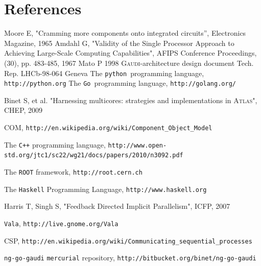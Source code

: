 \documentclass[a4paper]{jpconf}
\newcommand{\gaudi}{\textsc{Gaudi}}
\newcommand{\python}{\texttt{python}}
\newcommand{\cython}{\texttt{cython}}
\newcommand{\golang}{\texttt{Go}}
\begin{document}
\section*{References}
\begin{thebibliography}{9}
 Moore E, "Cramming more components onto integrated circuits'', Electronics Magazine, 1965
 Amdahl G, "Validity of the Single Processor Approach to Achieving Large-Scale Computing Capabilities", AFIPS Conference Proceedings, (30), pp. 483-485, 1967
 Mato P 1998 \gaudi-architecture design document Tech. Rep. LHCb-98-064 Geneva
 The \python\ programming language, \verb'http://python.org'
 The \golang\ programming language, \verb'http://golang.org/'

 Binet S, et al. "Harnessing multicores: strategies and
  implementations in \textsc{Atlas}", CHEP, 2009

 COM, \verb'http://en.wikipedia.org/wiki/Component_Object_Model'

 The \texttt{C++} programming language,
  \verb'http://www.open-std.org/jtc1/sc22/wg21/docs/papers/2010/n3092.pdf'

 The \texttt{ROOT} framework,
  \verb"http://root.cern.ch"

 The \texttt{Haskell} Programming Language,
  \verb'http://www.haskell.org'

 Harris T, Singh S, "Feedback
  Directed Implicit Parallelism", ICFP, 2007

 \texttt{Vala}, \verb'http://live.gnome.org/Vala'

 CSP,
  \verb'http://en.wikipedia.org/wiki/Communicating_sequential_processes'

 \texttt{ng-go-gaudi} \verb'mercurial' repository,
  \verb'http://bitbucket.org/binet/ng-go-gaudi'

\end{thebibliography}
\end{document}
